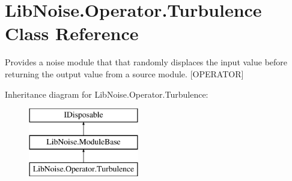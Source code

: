 \hypertarget{class_lib_noise_1_1_operator_1_1_turbulence}{}\section{Lib\+Noise.\+Operator.\+Turbulence Class Reference}
\label{class_lib_noise_1_1_operator_1_1_turbulence}


Provides a noise module that that randomly displaces the input value before returning the output value from a source module. \mbox{[}O\+P\+E\+R\+A\+T\+OR\mbox{]}  


Inheritance diagram for Lib\+Noise.\+Operator.\+Turbulence\+:\begin{figure}[H]
\begin{center}
\leavevmode
\includegraphics[height=3.000000cm]{class_lib_noise_1_1_operator_1_1_turbulence}
\end{center}
\end{figure}

